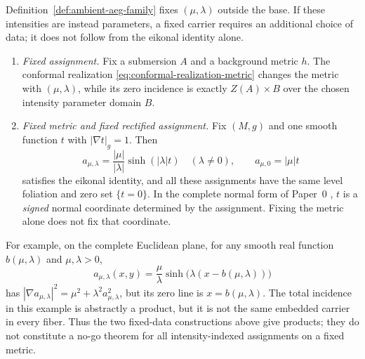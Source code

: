 \begin{remark}
\label{rem:intensity-plane-not-a-base}
Definition~\ref{def:ambient-aeg-family} fixes $(\mu,\lambda)$ outside the base.
If these intensities are instead parameters, a fixed carrier requires an
additional choice of data; it does not follow from the eikonal identity alone.
\begin{enumerate}
\item \emph{Fixed assignment.}  Fix a submersion $A$ and a background metric $h$.
The conformal realization \eqref{eq:conformal-realization-metric} changes the
metric with $(\mu,\lambda)$, while its zero incidence is exactly
$Z(A)\times B$ over the chosen intensity parameter domain $B$.
\item \emph{Fixed metric and fixed rectified assignment.}  Fix $(M,g)$ and one
smooth function $t$ with $|\nabla t|_g=1$.  Then
\[
 a_{\mu,\lambda}=\frac{|\mu|}{|\lambda|}\sinh(|\lambda|t)
 \quad(\lambda\ne0),\qquad a_{\mu,0}=|\mu|t
\]
satisfies the eikonal identity, and all these assignments have the same level
foliation and zero set $\{t=0\}$.  In the complete normal form of Paper~0
\cite{Yuan2026AEGPaperZero}, $t$ is a \emph{signed} normal coordinate determined
by the assignment.  Fixing the metric alone does not fix that coordinate.
\end{enumerate}
For example, on the complete Euclidean plane, for any smooth real function
$b(\mu,\lambda)$ and $\mu,\lambda>0$,
\begin{equation}
 a_{\mu,\lambda}(x,y)
 =\frac{\mu}{\lambda}\sinh\bigl(\lambda(x-b(\mu,\lambda))\bigr)
 \label{eq:intensity-moving-zero}
\end{equation}
has $|\nabla a_{\mu,\lambda}|^2=\mu^2+\lambda^2a_{\mu,\lambda}^2$, but its zero
line is $x=b(\mu,\lambda)$.  The total incidence in this example is abstractly
a product, but it is not the same embedded carrier in every fiber.  Thus the two
fixed-data constructions above give products; they do not constitute a no-go
theorem for all intensity-indexed assignments on a fixed metric.
\end{remark}


